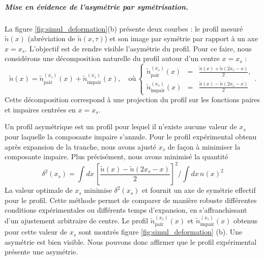 \subparagraph{Mise en évidence de l’asymétrie par symétrisation.}
La figure \ref{fig:simul_deformation}(b) présente deux courbes : le profil mesuré $\tilde{n}(x)$ (abréviation de $\tilde{n}(x,\tau)$) et son image par symétrie par rapport à un axe $x = x_s$. L’objectif est de rendre visible l’asymétrie du profil.
Pour ce faire, nous considérons une décomposition naturelle du profil autour d’un centre $x = x_s$ :
\begin{equation}
\tilde{n}(x) = \tilde{n}_{\text{pair}}^{(x_s)}(x) + \tilde{n}_{\text{impair}}^{(x_s)}(x),\quad \mbox{où} \, \left\{\begin{array}{lcr}\tilde{n}_{\text{pair}}^{(x_s)}(x) &=&  \displaystyle \frac{\tilde{n}(x) + \tilde{n}(2x_s - x)}{2} , \\ \tilde{n}_{\text{impair}}^{(x_s)}(x) &=& \displaystyle \frac{\tilde{n}(x) - \tilde{n}(2x_s - x) }{2}\end{array} \right. .
\end{equation}
Cette décomposition correspond à une projection du profil sur les fonctions paires et impaires centrées en $x = x_s$.

\medskip



Un profil asymétrique est un profil pour lequel il n'existe aucune valeur de $x_s$ pour laquelle la composante impaire s'annule. Pour le profil expérimental obtenu après expansion de la tranche, nous avons ajusté $x_s$ de façon à minimiser la composante impaire. Plus précisément, nous avons minimisé la quantité
\begin{equation}
\mathcal{\delta}^2(x_s) = \int dx\, \left[\frac{\tilde{n}(x) - \tilde{n}(2x_s - x)}{2}\right]^2 \Big / \int dx \,  n(x)^2
\end{equation}
La valeur optimale de $x_s$ minimise $\mathcal{\delta}^2(x_s)$ et fournit un axe de symétrie effectif pour le profil. Cette méthode permet de comparer de manière robuste différentes conditions expérimentales ou différents temps d’expansion, en s’affranchissant d’un ajustement arbitraire de centre.
Le profil $\tilde{n}_{\text{pair}}^{(x_s)}(x)$ et $\tilde{n}_{\text{impair}}^{(x_s)}(x)$ obtenus pour cette valeur de $x_s$ sont montrés figure \ref{fig:simul_deformation} (b). Une asymétrie est bien visible. Nous pouvons donc affirmer que le profil expérimental présente une asymétrie. 


